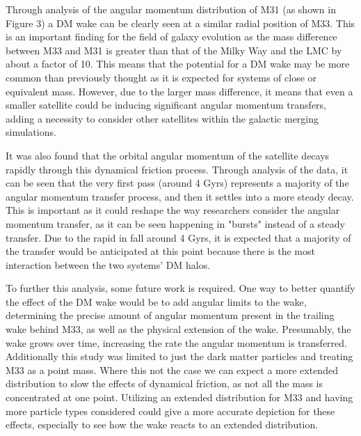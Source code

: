 \documentclass[fleqn,usenatbib]{mnras}
\begin{document}
\vspace{10pt}

Through analysis of the angular momentum distribution of M31 (as shown in Figure 3) a DM wake can be clearly seen at a similar radial position of M33. This is an important finding for the field of galaxy evolution as the mass difference between M33 and M31 is greater than that of the Milky Way and the LMC by about a factor of 10. This means that the potential for a DM wake may be more common than previously thought as it is expected for systems of close or equivalent mass. However, due to the larger mass difference, it means that even a smaller satellite could be inducing significant angular momentum transfers, adding a necessity to consider other satellites within the galactic merging simulations. 

\vspace{10pt}

It was also found that the orbital angular momentum of the satellite decays rapidly through this dynamical friction process. Through analysis of the data, it can be seen that the very first pass (around 4 Gyrs) represents a majority of the angular momentum transfer process, and then it settles into a more steady decay. This is important as it could reshape the way researchers consider the angular momentum transfer, as it can be seen happening in "bursts" instead of a steady transfer. Due to the rapid in fall around 4 Gyrs, it is expected that a majority of the transfer would be anticipated at this point because there is the most interaction between the two systems' DM halos.  

\vspace{10pt}

To further this analysis, some future work is required. One way to better quantify the effect of the DM wake would be to add angular limits to the wake, determining the precise amount of angular momentum present in the trailing wake behind M33, as well as the physical extension of the wake. Presumably, the wake grows over time, increasing the rate the angular momentum is transferred. Additionally this study was limited to just the dark matter particles and treating M33 as a point mass. Where this not the case we can expect a more extended distribution to slow the effects of dynamical friction, as not all the mass is concentrated at one point. Utilizing an extended distribution for M33 and having more particle types considered could give a more accurate depiction for these effects, especially to see how the wake reacts to an extended distribution. 
\end{document}
